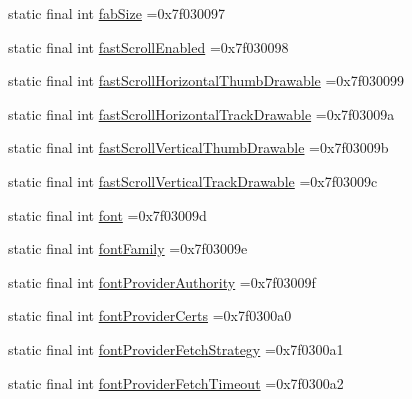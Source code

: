 \begin{DoxyCompactItemize}
\item 
static final int \mbox{\hyperlink{classbr_1_1unb_1_1cic_1_1mp_1_1marketmaster_1_1R_1_1attr_a0b71837f81ce46711a626af8b0b06149}{fab\+Size}} =0x7f030097
\item 
static final int \mbox{\hyperlink{classbr_1_1unb_1_1cic_1_1mp_1_1marketmaster_1_1R_1_1attr_acbab85e5a1f5a6b99cbd3c3ef7d431cb}{fast\+Scroll\+Enabled}} =0x7f030098
\item 
static final int \mbox{\hyperlink{classbr_1_1unb_1_1cic_1_1mp_1_1marketmaster_1_1R_1_1attr_af5d31c05b916303c68a8348a1c1de019}{fast\+Scroll\+Horizontal\+Thumb\+Drawable}} =0x7f030099
\item 
static final int \mbox{\hyperlink{classbr_1_1unb_1_1cic_1_1mp_1_1marketmaster_1_1R_1_1attr_a79c338302f75ab5ff2906f74038ae3f3}{fast\+Scroll\+Horizontal\+Track\+Drawable}} =0x7f03009a
\item 
static final int \mbox{\hyperlink{classbr_1_1unb_1_1cic_1_1mp_1_1marketmaster_1_1R_1_1attr_af1738e817e24c6db953d3d536c10ada9}{fast\+Scroll\+Vertical\+Thumb\+Drawable}} =0x7f03009b
\item 
static final int \mbox{\hyperlink{classbr_1_1unb_1_1cic_1_1mp_1_1marketmaster_1_1R_1_1attr_ab6a9905a7927323e794922188547744f}{fast\+Scroll\+Vertical\+Track\+Drawable}} =0x7f03009c
\item 
static final int \mbox{\hyperlink{classbr_1_1unb_1_1cic_1_1mp_1_1marketmaster_1_1R_1_1attr_a9c0c4e2a4861386cb82a7249724d874f}{font}} =0x7f03009d
\item 
static final int \mbox{\hyperlink{classbr_1_1unb_1_1cic_1_1mp_1_1marketmaster_1_1R_1_1attr_a401da0fdf7beda0bd9d597e064e862a0}{font\+Family}} =0x7f03009e
\item 
static final int \mbox{\hyperlink{classbr_1_1unb_1_1cic_1_1mp_1_1marketmaster_1_1R_1_1attr_a1cecc245711e8f8363d3cc39d24c75ab}{font\+Provider\+Authority}} =0x7f03009f
\item 
static final int \mbox{\hyperlink{classbr_1_1unb_1_1cic_1_1mp_1_1marketmaster_1_1R_1_1attr_ab42dba6a9c145d416964c9dd2617d5cb}{font\+Provider\+Certs}} =0x7f0300a0
\item 
static final int \mbox{\hyperlink{classbr_1_1unb_1_1cic_1_1mp_1_1marketmaster_1_1R_1_1attr_a7b6f17477e7e2cf2a7204660abec2c2d}{font\+Provider\+Fetch\+Strategy}} =0x7f0300a1
\item 
static final int \mbox{\hyperlink{classbr_1_1unb_1_1cic_1_1mp_1_1marketmaster_1_1R_1_1attr_ad5fdbe4eae2c0fb3ad52337ddec46d79}{font\+Provider\+Fetch\+Timeout}} =0x7f0300a2
\item 

\end{DoxyCompactItemize}
